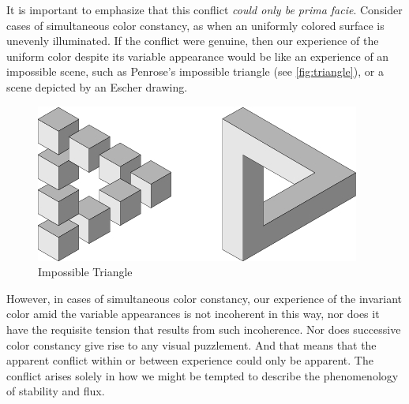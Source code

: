 \documentclass[12pt]{article}
\begin{document}
It is important to emphasize that this conflict \emph{could only be prima facie}. Consider cases of simultaneous color constancy, as when an uniformly colored surface is unevenly illuminated. If the conflict were genuine, then our experience of the uniform color despite its variable appearance would be like an experience of an impossible scene, such as Penrose's \citeyearpar{Penrose:1958kx} impossible triangle (see \autoref{fig:triangle}), or a scene depicted by an Escher drawing.
	\begin{figure}[htbp]
		\centering
			\includegraphics[scale=1]{triangle.jpg}
		\caption{Impossible Triangle}
		\label{fig:triangle}
	\end{figure}
However, in cases of simultaneous color constancy, our experience of the invariant color amid the variable appearances is not incoherent in this way, nor does it have the requisite tension that results from such incoherence. Nor does successive color constancy give rise to any visual puzzlement. And that means that the apparent conflict within or between experience could only be apparent. The conflict arises solely in how we might be tempted to describe the phenomenology of stability and flux. 
\end{document}
